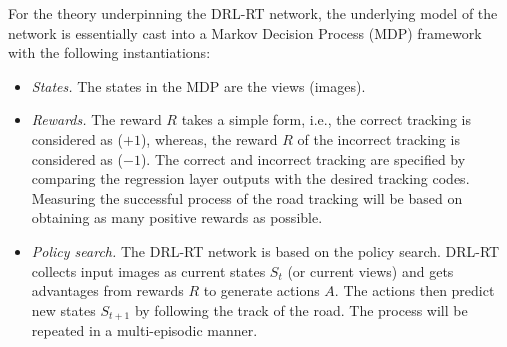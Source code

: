 \documentclass{svproc}
\begin{document}

For the theory underpinning the DRL-RT network, the underlying model of the network is essentially cast into a Markov Decision Process (MDP) framework with the following instantiations:
\begin{itemize}
	\item \emph{States.} The states in the MDP are the views (images).  
	\item \emph{Rewards.} The reward $R$ takes a simple form, i.e., the correct tracking is considered as ($+1$), whereas, the reward $R$ of the incorrect tracking is considered as ($-1$). The correct and incorrect tracking are specified by comparing the regression layer outputs with the desired tracking codes. Measuring the successful process of the road tracking will be based on obtaining as many positive rewards as possible. 

	
	\item \emph{Policy search.} The DRL-RT network is based on the policy search. %
	DRL-RT collects input images as current states $S_t$ (or current views) and gets advantages from rewards $R$ to generate actions $A$. The actions then predict new states $S_{t+1}$ by following the track of the road. The process will be repeated in a multi-episodic manner.

\end{itemize}
 
\end{document}
